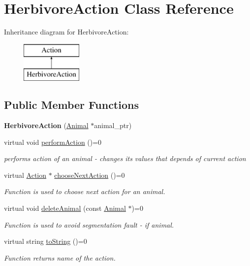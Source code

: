 \hypertarget{class_herbivore_action}{}\section{Herbivore\+Action Class Reference}
\label{class_herbivore_action}
Inheritance diagram for Herbivore\+Action\+:\begin{figure}[H]
\begin{center}
\leavevmode
\includegraphics[height=2.000000cm]{class_herbivore_action}
\end{center}
\end{figure}
\subsection*{Public Member Functions}
\begin{DoxyCompactItemize}
\item 
\hypertarget{class_herbivore_action_ad9541eff36921c0f14a6e3a755099baa}{}{\bfseries Herbivore\+Action} (\hyperlink{class_animal}{Animal} $\ast$animal\+\_\+ptr)\label{class_herbivore_action_ad9541eff36921c0f14a6e3a755099baa}

\item 
virtual void \hyperlink{class_herbivore_action_a85823422b73721792c11abdfbb02acc7}{perform\+Action} ()=0
\begin{DoxyCompactList}\small\item\em performs action of an animal -\/ changes it\textquotesingle{}s values that depends of current action \end{DoxyCompactList}\item 
virtual \hyperlink{class_action}{Action} $\ast$ \hyperlink{class_herbivore_action_aa5b97dfe80450e8c340158d864b4aae8}{choose\+Next\+Action} ()=0
\begin{DoxyCompactList}\small\item\em Function is used to choose next action for an animal. \end{DoxyCompactList}\item 
virtual void \hyperlink{class_herbivore_action_a62d0620d0e29fd560260cbc0f9f81abb}{delete\+Animal} (const \hyperlink{class_animal}{Animal} $\ast$)=0
\begin{DoxyCompactList}\small\item\em Function is used to avoid segmentation fault -\/ if animal. \end{DoxyCompactList}\item 
virtual string \hyperlink{class_herbivore_action_a69260348107b56b677b4e50375a25774}{to\+String} ()=0
\begin{DoxyCompactList}\small\item\em Function returns name of the action. \end{DoxyCompactList}\end{DoxyCompactItemize}
